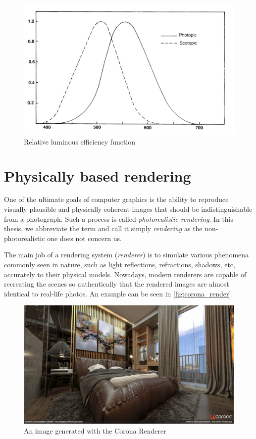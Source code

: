 \begin{figure}[h]
	\centering
	\includegraphics[width=0.8\linewidth]{img/luminous_efficiency.png}
	\caption{Relative luminous efficiency function~\cite{colorScienceSlides}}
	\label{fig:lum}
\end{figure}

\section{Physically based rendering}

One of the ultimate goals of computer graphics is the ability to reproduce visually plausible and physically coherent images that should be indistinguishable from a photograph. Such a process is called \emph{photorealistic rendering}. In this thesis, we abbreviate the term and call it simply \emph{rendering} as the non-photorealistic one does not concern us.

The main job of a rendering system (\emph{renderer}) is to simulate various phenomena commonly seen in nature, such as light reflections, refractions, shadows, etc, accurately to their physical models. Nowadays, modern renderers are capable of recreating the scenes so authentically that the rendered images are almost identical to real-life photos. An example can be seen in \autoref{fig:corona_render}.

\begin{figure}[h]
	\centering
	\includegraphics[width=\linewidth]{img/corona_render.jpg}
	\caption[Corona image]{An image generated with the Corona Renderer\footnotemark}
	\label{fig:corona_render}
\end{figure}

